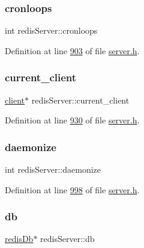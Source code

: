 \mbox{\label{structredisServer_a539ef9a4d1c37fd91fef31d216ff32e9}} 
\subsubsection{\texorpdfstring{cronloops}{cronloops}}
{\footnotesize\ttfamily int redis\+Server\+::cronloops}



Definition at line \hyperlink{server_8h_source_l00903}{903} of file \hyperlink{server_8h_source}{server.\+h}.

\mbox{\label{structredisServer_a428ff4aedfa034a805df4b9f6498e3b2}} 
\subsubsection{\texorpdfstring{current\+\_\+client}{current\_client}}
{\footnotesize\ttfamily \hyperlink{structclient}{client}$\ast$ redis\+Server\+::current\+\_\+client}



Definition at line \hyperlink{server_8h_source_l00930}{930} of file \hyperlink{server_8h_source}{server.\+h}.

\mbox{\label{structredisServer_a6b46cd70523fa48579926a8076f255d0}} 
\subsubsection{\texorpdfstring{daemonize}{daemonize}}
{\footnotesize\ttfamily int redis\+Server\+::daemonize}



Definition at line \hyperlink{server_8h_source_l00998}{998} of file \hyperlink{server_8h_source}{server.\+h}.

\mbox{\label{structredisServer_a7e7c26c4e423dbbc81b3f29b4d4b2530}} 
\subsubsection{\texorpdfstring{db}{db}}
{\footnotesize\ttfamily \hyperlink{structredisDb}{redis\+Db}$\ast$ redis\+Server\+::db}




